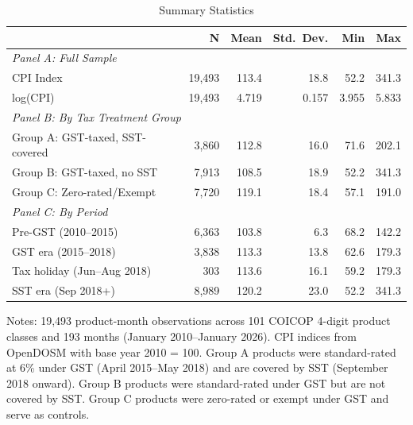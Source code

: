\begin{table}[H]
\centering
\caption{Summary Statistics}
\label{tab:summary}
\begin{threeparttable}
\begin{tabular}{lrrrrr}
\toprule
 & N & Mean & Std.\ Dev. & Min & Max \\
\midrule
\multicolumn{6}{l}{\textit{Panel A: Full Sample}} \\
CPI Index & 19,493 & 113.4 & 18.8 & 52.2 & 341.3 \\
log(CPI) & 19,493 & 4.719 & 0.157 & 3.955 & 5.833 \\
\midrule
\multicolumn{6}{l}{\textit{Panel B: By Tax Treatment Group}} \\
Group A: GST-taxed, SST-covered & 3,860 & 112.8 & 16.0 & 71.6 & 202.1 \\
Group B: GST-taxed, no SST & 7,913 & 108.5 & 18.9 & 52.2 & 341.3 \\
Group C: Zero-rated/Exempt & 7,720 & 119.1 & 18.4 & 57.1 & 191.0 \\
\midrule
\multicolumn{6}{l}{\textit{Panel C: By Period}} \\
Pre-GST (2010--2015) & 6,363 & 103.8 & 6.3 & 68.2 & 142.2 \\
GST era (2015--2018) & 3,838 & 113.3 & 13.8 & 62.6 & 179.3 \\
Tax holiday (Jun--Aug 2018) & 303 & 113.6 & 16.1 & 59.2 & 179.3 \\
SST era (Sep 2018+) & 8,989 & 120.2 & 23.0 & 52.2 & 341.3 \\
\bottomrule
\end{tabular}
\begin{tablenotes}[flushleft]
\small
\item Notes: 19,493 product-month observations across 101 COICOP 4-digit product classes and 193 months (January 2010--January 2026). CPI indices from OpenDOSM with base year 2010 = 100. Group A products were standard-rated at 6\% under GST (April 2015--May 2018) and are covered by SST (September 2018 onward). Group B products were standard-rated under GST but are not covered by SST. Group C products were zero-rated or exempt under GST and serve as controls.
\end{tablenotes}
\end{threeparttable}
\end{table}

